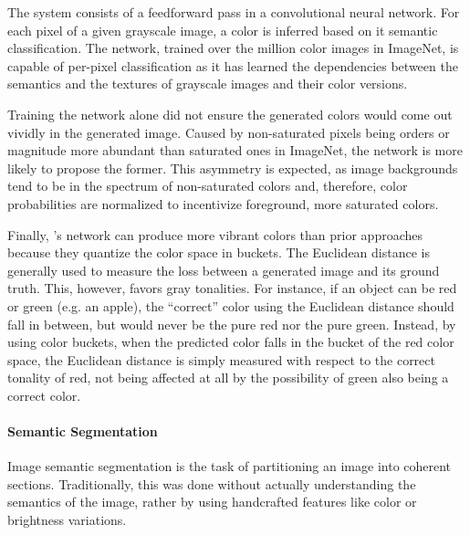 The system consists of a feedforward pass in a convolutional neural network.
For each pixel of a given grayscale image, a color is inferred based on it semantic classification.
The network, trained over the million color images in ImageNet, is capable of per-pixel classification as it has learned the dependencies between the semantics and the textures of grayscale images and their color versions.

Training the network alone did not ensure the generated colors would come out vividly in the generated image.
Caused by non-saturated pixels being orders or magnitude more abundant than saturated ones in ImageNet, the network is more likely to propose the former.
This asymmetry is expected, as image backgrounds tend to be in the spectrum of non-saturated colors and, therefore, color probabilities are normalized to incentivize foreground, more saturated colors.

Finally, \citeauthor{Zhang2016}'s network can produce more vibrant colors than prior approaches because they quantize the color space in buckets.
The Euclidean distance is generally used to measure the loss between a generated image and its ground truth.
This, however, favors gray tonalities.
For instance, if an object can be red or green (e.g. an apple), the ``correct'' color using the Euclidean distance should fall in between, but would never be the pure red nor the pure green.
Instead, by using color buckets, when the predicted color falls in the bucket of the red color space, the Euclidean distance is simply measured with respect to the correct tonality of red, not being affected at all by the possibility of green also being a correct color.

\paragraph{Semantic Segmentation}
Image semantic segmentation is the task of partitioning an image into coherent sections.
Traditionally, this was done without actually understanding the semantics of the image, rather by using handcrafted features like color or brightness variations.


